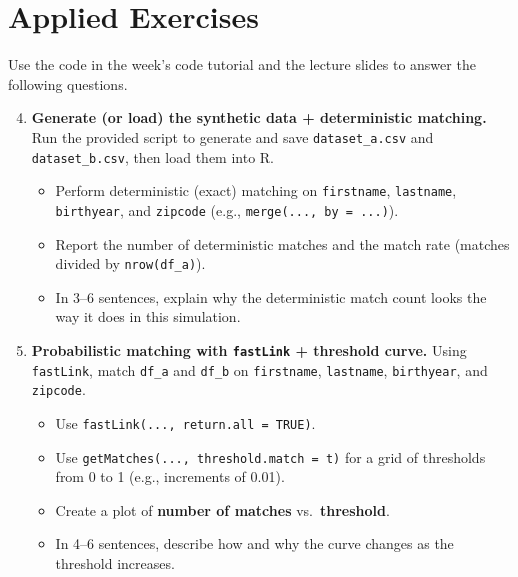 \documentclass[11pt]{article}
\begin{document}
\section*{Applied Exercises}
Use the code in the week's code tutorial and the lecture slides to answer the following questions.\bigskip

  \begin{enumerate}
\setcounter{enumi}{3}

\item \textbf{Generate (or load) the synthetic data + deterministic matching.}
Run the provided script to generate and save \texttt{dataset\_a.csv} and \texttt{dataset\_b.csv}, then load them into R.
\begin{itemize}
  \item Perform deterministic (exact) matching on \texttt{firstname}, \texttt{lastname}, \texttt{birthyear}, and \texttt{zipcode} (e.g., \texttt{merge(..., by = ...)}).
  \item Report the number of deterministic matches and the match rate (matches divided by \texttt{nrow(df\_a)}).
  \item In 3--6 sentences, explain why the deterministic match count looks the way it does in this simulation.
\end{itemize}

\item \textbf{Probabilistic matching with \texttt{fastLink} + threshold curve.}
Using \texttt{fastLink}, match \texttt{df\_a} and \texttt{df\_b} on \texttt{firstname}, \texttt{lastname}, \texttt{birthyear}, and \texttt{zipcode}.
\begin{itemize}
  \item Use \texttt{fastLink(..., return.all = TRUE)}.
  \item Use \texttt{getMatches(..., threshold.match = t)} for a grid of thresholds from 0 to 1 (e.g., increments of 0.01).
  \item Create a plot of \textbf{number of matches} vs.\ \textbf{threshold}.
  \item In 4--6 sentences, describe how and why the curve changes as the threshold increases.
\end{itemize}


\end{enumerate}
\end{document}

